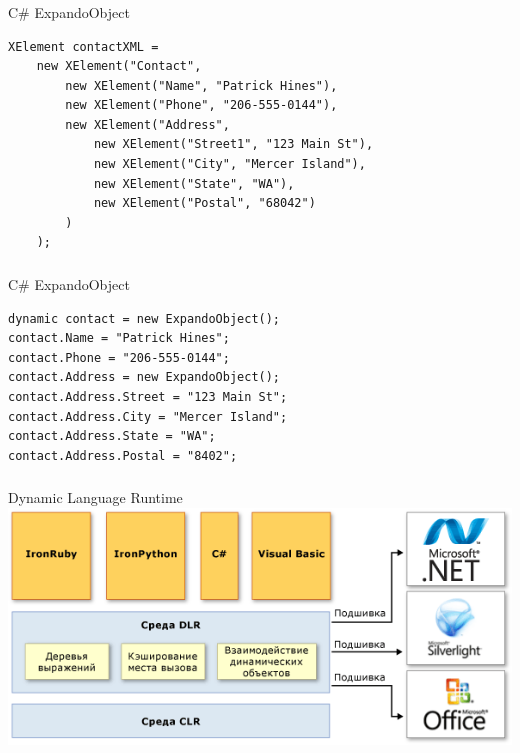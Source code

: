 \documentclass[t]{beamer}  %
\begin{document}
\begin{frame}[fragile]
	\frametitle{\insertsection} 
    \framesubtitle{\insertsubsection}
	\begin{block}{C\# ExpandoObject}
		\begin{verbatim}
XElement contactXML =
    new XElement("Contact",
        new XElement("Name", "Patrick Hines"),
        new XElement("Phone", "206-555-0144"),
        new XElement("Address",
            new XElement("Street1", "123 Main St"),
            new XElement("City", "Mercer Island"),
            new XElement("State", "WA"),
            new XElement("Postal", "68042")
        )
    );
		\end{verbatim}
	\end{block}
\end{frame}


\begin{frame}[fragile]
	\frametitle{\insertsection} 
    \framesubtitle{\insertsubsection}
	\begin{block}{C\# ExpandoObject}
		\begin{verbatim}
dynamic contact = new ExpandoObject();
contact.Name = "Patrick Hines";
contact.Phone = "206-555-0144";
contact.Address = new ExpandoObject();
contact.Address.Street = "123 Main St";
contact.Address.City = "Mercer Island";
contact.Address.State = "WA";
contact.Address.Postal = "8402";
		\end{verbatim}
	\end{block}
\end{frame}


\begin{frame}[fragile]
	\frametitle{\insertsection} 
  	\framesubtitle{\insertsubsection}
    \begin{block}{Dynamic Language Runtime}
		\includegraphics[height=0.55\paperheight]{dlr} 
    \end{block}
\end{frame}
\end{document}
